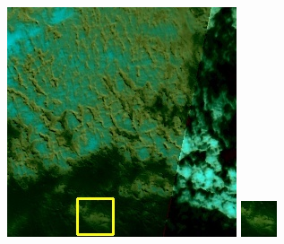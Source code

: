 \documentclass[10pt]{ctexart}
\begin{document}
\begin{multicols}{2}
\begin{figure}[H]
{\begin{minipage}[b]{0.15\linewidth}
            \includegraphics[width=1\linewidth]{../log/spoon2/cut2/LC81620432014072LGN00_16237_spectral.jpg}\vspace{4pt}
            \includegraphics[width=1\linewidth]{../log/spoon2/cut2/tmp_cut_LC81620432014072LGN00_16237_spectral.jpg}\vspace{4pt}

\end{minipage}}
\end{figure}
\end{multicols}
\end{document}
